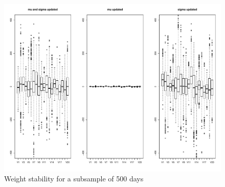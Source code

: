 \begin{figure}[H]
\includegraphics[width=15cm]{Boxplot_question_1.pdf}
\caption{Weight stability for a subsample of 500 days}
\label{fig1}
\end{figure}


